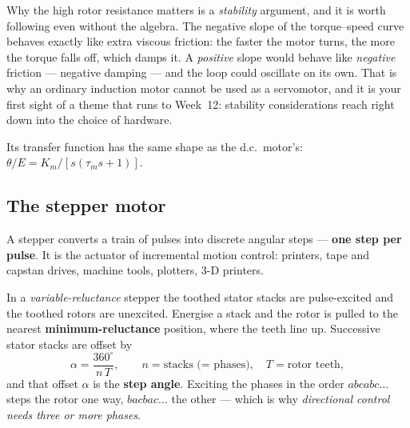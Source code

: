 \documentclass[11pt,a4paper]{article}
\begin{document}
\begin{keyidea}
Why the high rotor resistance matters is a \emph{stability} argument, and it is
worth following even without the algebra. The negative slope of the
torque--speed curve behaves exactly like extra viscous friction: the faster the
motor turns, the more the torque falls off, which damps it. A \emph{positive}
slope would behave like \emph{negative} friction --- negative damping --- and
the loop could oscillate on its own. That is why an ordinary induction motor
cannot be used as a servomotor, and it is your first sight of a theme that runs
to Week~12: stability considerations reach right down into the choice of
hardware.
\end{keyidea}

Its transfer function has the same shape as the d.c.\ motor's:
$\theta/E = K_{m}/[s(\tau_{m}s+1)]$.

\subsection*{The stepper motor}

A stepper converts a train of pulses into discrete angular steps ---
\textbf{one step per pulse}. It is the actuator of incremental motion control:
printers, tape and capstan drives, machine tools, plotters, 3-D printers.

In a \emph{variable-reluctance} stepper the toothed stator stacks are
pulse-excited and the toothed rotors are unexcited. Energise a stack and the
rotor is pulled to the nearest \textbf{minimum-reluctance} position, where the
teeth line up. Successive stator stacks are offset by
\[
  \alpha=\frac{360^{\circ}}{n\,T},
  \qquad n=\text{stacks (= phases)},\quad T=\text{rotor teeth},
\]
and that offset $\alpha$ is the \textbf{step angle}. Exciting the phases in the
order $abcabc\ldots$ steps the rotor one way, $bacbac\ldots$ the other ---
which is why \emph{directional control needs three or more phases}.
\end{document}
